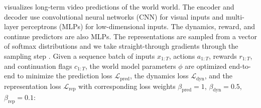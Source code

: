 
 visualizes long-term video predictions of the world world.
The encoder and decoder use convolutional neural networks (CNN) \citep{lecun1989cnn} for visual inputs and multi-layer perceptrons (MLPs) for low-dimensional inputs.
The dynamics, reward, and continue predictors are also MLPs.
The representations are sampled from a vector of softmax distributions and we take straight-through gradients through the sampling step \citep{bengio2013straight,hafner2020dreamerv2}.
Given a sequence batch of inputs $x_{1:T}$, actions $a_{1:T}$, rewards $r_{1:T}$, and continuation flags $c_{1:T}$, the world model parameters $\phi$ are optimized end-to-end to minimize the prediction loss $\mathcal{L}_{\mathrm{pred}}$, the dynamics loss $\mathcal{L}_{\mathrm{dyn}}$, and the representation loss $\mathcal{L}_{\mathrm{rep}}$ with corresponding loss weights $\beta_{\mathrm{pred}}=1$,  $\beta_{\mathrm{dyn}}=0.5$, $\beta_{\mathrm{rep}}=0.1$:



